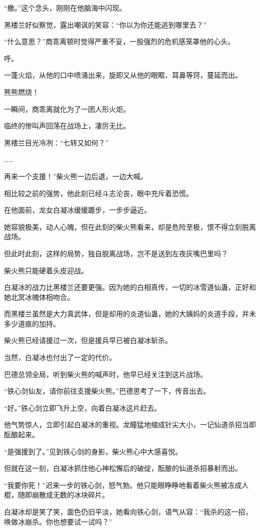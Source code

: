 \begin{this_body}
“撤。”这个念头，刚刚在他脑海中闪现。

黑楼兰好似察觉，露出嘲讽的笑容：“你以为你还能逃到哪里去？”

“什么意思？”商乖离顿时觉得严重不妥，一股强烈的危机感笼罩他的心头。

呼。

一蓬火焰，从他的口中喷涌出来，旋即又从他的眼眶、耳鼻等窍，蔓延而出。

熊熊燃烧！

一瞬间，商乖离就化为了一团人形火炬。

临终的惨叫声回荡在战场上，凄厉无比。

黑楼兰目光冷冽：“七转又如何？”

……

再来一个支援！”柴火熊一边后退，一边大喊。

相比较之前的强势，他此刻已经斗志沦丧，眼中充斥着恐慌。

在他面前，龙女白凝冰缓缓踱步，一步步逼近。

她容貌极美，动人心魄，但在此刻的柴火熊看来，却是危险至极，恨不得立刻脱离战场。

但此时此刻，这样的局势，独自脱离战场，岂不是送到左夜灰嘴巴里吗？

柴火熊只能硬着头皮迎战。

白凝冰的战力比黑楼兰还要更强。因为她的白相真传，一切的冰雪道仙蛊，正好和她北冥冰魄体相吻合。

而黑楼兰虽然是大力真武体，但是却用的炎道仙蛊，她的大姨妈的炎道手段，并未多少道痕的加持。

柴火熊已经请援过一次，但是援兵早已被白凝冰斩杀。

当然，白凝冰也付出了一定的代价。

巴德总领全局，听到柴火熊的喊声时，他早已经关注到这片战场。

“铁心剑仙友，请你前往支援柴火熊。”巴德思考了一下，传音出去。

“好。”铁心剑立即飞升上空，向着白凝冰这片赶去。

他气势惊人，立即引起白凝冰的重视。龙瞳猛地缩成针尖大小，一记仙道杀招当即酝酿起来。

“是强援到了。”见到铁心剑的身影，柴火熊心中大感喜悦。

但就在这一刻，白凝冰抓住他心神松懈后的破绽，酝酿的仙道杀招暴射而出。

“我要你死！”迟来一步的铁心剑，怒气勃。他只能眼睁睁地看着柴火熊被冻成人棍，随即崩散成无数的冰块碎片。

白凝冰却是笑了笑，面色仍旧平淡，她看向铁心剑，语气从容：“我杀的这一招，唤做冰崩杀。你也想要试一试吗？”


\end{this_body}
